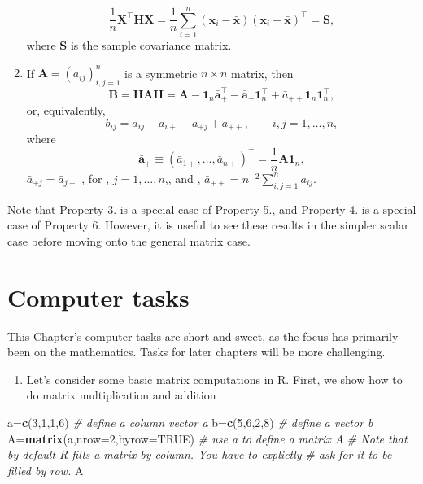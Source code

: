 \documentclass[]{book}
\newenvironment{Shaded}{\begin{snugshade}}{\end{snugshade}}
\newcommand{\CommentTok}[1]{\textcolor[rgb]{0.56,0.35,0.01}{\textit{#1}}}
\newcommand{\DataTypeTok}[1]{\textcolor[rgb]{0.13,0.29,0.53}{#1}}
\newcommand{\DecValTok}[1]{\textcolor[rgb]{0.00,0.00,0.81}{#1}}
\newcommand{\KeywordTok}[1]{\textcolor[rgb]{0.13,0.29,0.53}{\textbf{#1}}}
\newcommand{\NormalTok}[1]{#1}
\newcommand{\OtherTok}[1]{\textcolor[rgb]{0.56,0.35,0.01}{#1}}
\providecommand{\tightlist}{%
  \setlength{\itemsep}{0pt}\setlength{\parskip}{0pt}}
\theoremstyle{definition}
\theoremstyle{definition}
\theoremstyle{definition}
\theoremstyle{remark}
\begin{document}
\begin{enumerate}
  \[
  \frac{1}{n}\mathbf X^\top \mathbf H\mathbf X=\frac{1}{n} \sum_{i=1}^n (\mathbf x_i -\bar{\mathbf x})(\mathbf x_i -\bar{\mathbf x})^\top =\mathbf S,
  \]
  where \(\mathbf S\) is the sample covariance matrix.
\item
  If \(\mathbf A=(a_{ij})_{i,j=1}^n\) is a symmetric \(n \times n\) matrix, then
  \[
  \mathbf B=\mathbf H\mathbf A\mathbf H= \mathbf A- {\mathbf 1}_n \bar{\mathbf a}_+^\top -\bar{\mathbf a}_+{\mathbf 1}_n^\top +\bar{a}_{++}{\mathbf 1}_n {\mathbf 1}_n^\top,
  \]
  or, equivalently,
  \[
  b_{ij}=a_{ij}-\bar{a}_{i+}-\bar{a}_{+j}+\bar{a}_{++}, \qquad i,j=1, \ldots , n,
  \]
  where
  \[
  \bar{\mathbf a}_{+}\equiv (\bar{a}_{1+}, \ldots , \bar{a}_{n+})^\top=\frac{1}{n}\mathbf A{\mathbf 1}_n,
  \]
  \(\bar{a}_{+j}=\bar{a}_{j+}\) , for , \(j=1, \ldots , n\),, and , \(\bar{a}_{++}=n^{-2}\sum_{i,j=1}^n a_{ij}\).
\end{enumerate}

Note that Property 3. is a special case of Property 5., and Property 4. is a special case of Property 6.
However, it is useful to see these results in the simpler scalar case before moving onto the general matrix case.

\hypertarget{tasks-ch2}{%
\section{Computer tasks}\label{tasks-ch2}}

This Chapter's computer tasks are short and sweet, as the focus has primarily been on the mathematics. Tasks for later chapters will be more challenging.

\begin{enumerate}
\def\labelenumi{\arabic{enumi}.}
\setcounter{enumi}{-1}
\tightlist
\item
  Let's consider some basic matrix computations in R. First, we show how to do matrix multiplication and addition
\end{enumerate}

\begin{Shaded}
\begin{Highlighting}[]
\NormalTok{a=}\KeywordTok{c}\NormalTok{(}\DecValTok{3}\NormalTok{,}\DecValTok{1}\NormalTok{,}\DecValTok{1}\NormalTok{,}\DecValTok{6}\NormalTok{)                     }\CommentTok{# define a column  vector a}
\NormalTok{b=}\KeywordTok{c}\NormalTok{(}\DecValTok{5}\NormalTok{,}\DecValTok{6}\NormalTok{,}\DecValTok{2}\NormalTok{,}\DecValTok{8}\NormalTok{)                     }\CommentTok{# define a  vector b}
\NormalTok{A=}\KeywordTok{matrix}\NormalTok{(a,}\DataTypeTok{nrow=}\DecValTok{2}\NormalTok{,}\DataTypeTok{byrow=}\OtherTok{TRUE}\NormalTok{)    }\CommentTok{# use a to define a matrix A}
\CommentTok{# Note that by default R fills a matrix by column. You have to explictly}
\CommentTok{# ask for it to be filled by row.}
\NormalTok{A}
\end{Highlighting}
\end{Shaded}
\end{document}
